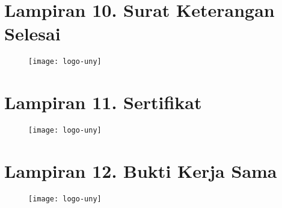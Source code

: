 \newpage

\section*{Lampiran 10. Surat Keterangan Selesai \tipe}
\begin{figure}[H]
	\centering
	\texttt{[image: logo-uny]}
\end{figure}

\newpage

\section*{Lampiran 11. Sertifikat \tipe}
\begin{figure}[H]
	\centering
	\texttt{[image: logo-uny]}
\end{figure}

\newpage

\section*{Lampiran 12. Bukti Kerja Sama}
\begin{figure}[H]
	\centering
	\texttt{[image: logo-uny]}
\end{figure}

\newpage

